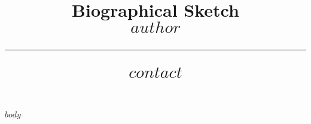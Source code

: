 \documentclass[svgnames, 12pt]{article}
\title{%
        \vspace{-2\baselineskip}
            \normalsize
            Biographical Sketch\\
            {\large\textbf{$author$}}\\
            \vspace{0.5\baselineskip}
            \hrule
            \vspace{0.5\baselineskip}
            $contact$
        \vspace{-1.5ex}
        }
\date{}
\author{}
\begin{document}
\maketitle
\vspace{-4\baselineskip}


$body$
\end{document}
